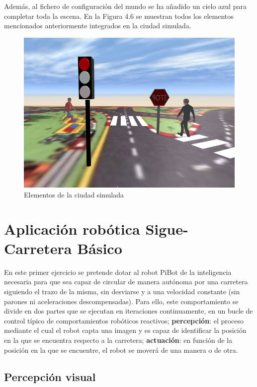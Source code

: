 \documentclass{report}
\begin{document}
Además, al fichero de configuración del mundo se ha añadido un cielo azul para completar toda la escena. En la Figura 4.6 se muestran todos los elementos mencionados anteriormente integrados en la ciudad simulada.
\hfill \break
\hfill \break
\hfill \break
\renewcommand{\figurename}{Figura}		
\begin{figure}[h]
	\centering
	 \includegraphics[scale=0.35]{images/cap4/ciudad-simulada.png}
	 \caption{Elementos de la ciudad simulada}
\end{figure}

\newpage
\section{Aplicación robótica Sigue-Carretera Básico}
En este primer ejercicio se pretende dotar al robot PiBot de la inteligencia necesaria para que sea capaz de circular de manera autónoma por una carretera siguiendo el trazo de la misma, sin desviarse y a una velocidad constante (sin parones ni aceleraciones descompensadas). Para ello, este comportamiento se divide en dos partes que se ejecutan en iteraciones continuamente, en un bucle de control típico de comportamientos robóticos reactivos; \textbf{percepción}: el proceso mediante el cual el robot capta una imagen y es capaz de identificar la posición en la que se encuentra respecto a la carretera; \textbf{actuación}: en función de la posición en la que se encuentre, el robot se moverá de una manera o de otra.


\subsection{Percepción visual}
\end{document}

